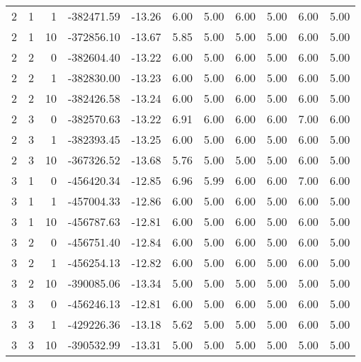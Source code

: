 \documentclass[10pt]{article} %
\begin{document}
\begin{table}[H]
\begin{tabular}{rrrrrrrrrrr}
  2 &   1 &   1 & -382471.59 & -13.26 & 6.00 & 5.00 & 6.00 & 5.00 & 6.00 & 5.00 \\
  2 &   1 &  10 & -372856.10 & -13.67 & 5.85 & 5.00 & 5.00 & 5.00 & 6.00 & 5.00 \\
  \hline                                            
  2 &   2 &   0 & -382604.40 & -13.22 & 6.00 & 5.00 & 6.00 & 5.00 & 6.00 & 5.00 \\
  2 &   2 &   1 & -382830.00 & -13.23 & 6.00 & 5.00 & 6.00 & 5.00 & 6.00 & 5.00 \\
  2 &   2 &  10 & -382426.58 & -13.24 & 6.00 & 5.00 & 6.00 & 5.00 & 6.00 & 5.00 \\
  \hline                                            
  2 &   3 &   0 & -382570.63 & -13.22 & 6.91 & 6.00 & 6.00 & 6.00 & 7.00 & 6.00 \\
  2 &   3 &   1 & -382393.45 & -13.25 & 6.00 & 5.00 & 6.00 & 5.00 & 6.00 & 5.00 \\
  2 &   3 &  10 & -367326.52 & -13.68 & 5.76 & 5.00 & 5.00 & 5.00 & 6.00 & 5.00 \\
  \hline                                            
  \hline                                            
  3 &   1 &   0 & -456420.34 & -12.85 & 6.96 & 5.99 & 6.00 & 6.00 & 7.00 & 6.00 \\
  3 &   1 &   1 & -457004.33 & -12.86 & 6.00 & 5.00 & 6.00 & 5.00 & 6.00 & 5.00 \\
  3 &   1 &  10 & -456787.63 & -12.81 & 6.00 & 5.00 & 6.00 & 5.00 & 6.00 & 5.00 \\
  \hline                                            
  3 &   2 &   0 & -456751.40 & -12.84 & 6.00 & 5.00 & 6.00 & 5.00 & 6.00 & 5.00 \\
  3 &   2 &   1 & -456254.13 & -12.82 & 6.00 & 5.00 & 6.00 & 5.00 & 6.00 & 5.00 \\
  3 &   2 &  10 & -390085.06 & -13.34 & 5.00 & 5.00 & 5.00 & 5.00 & 5.00 & 5.00 \\
  \hline                                            
  3 &   3 &   0 & -456246.13 & -12.81 & 6.00 & 5.00 & 6.00 & 5.00 & 6.00 & 5.00 \\
  3 &   3 &   1 & -429226.36 & -13.18 & 5.62 & 5.00 & 5.00 & 5.00 & 6.00 & 5.00 \\
  3 &   3 &  10 & -390532.99 & -13.31 & 5.00 & 5.00 & 5.00 & 5.00 & 5.00 & 5.00 \\
  \hline
\end{tabular}
\end{table}


% 
\end{document}
